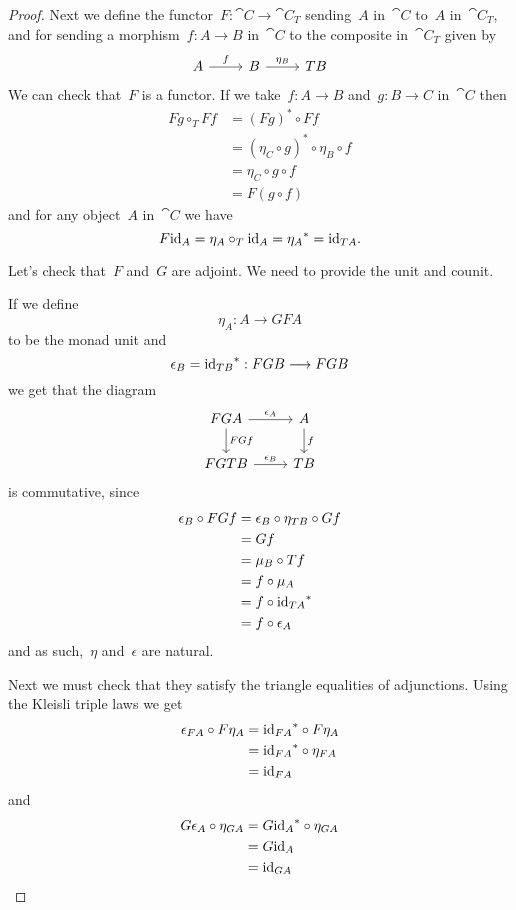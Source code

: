 \documentclass[../TFG.tex]{subfiles}
\begin{document}
\begin{proof}
    Next we define the functor~\(F:\cat{C}\longrightarrow\cat{C}_{T}\)
    sending~\(A\) in~\(\cat{C}\) to~\(A\) in~\(\cat{C}_{T}\), and for sending a
    morphism~\(f:A\longrightarrow B\) in~\(\cat{C}\) to the composite
    in~\(\cat{C}_{T}\) given by
    \[\begin{tikzcd}
        A \ar[r, "f"] & B \ar[r, "\eta_{B}"] & TB
    \end{tikzcd}\]
    We can check that~\(F\) is a functor. If we take~\(f:A\longrightarrow B\)
    and~\(g:B\longrightarrow C\) in~\(\cat{C}\) then
    \begin{align*}
        Fg \circ_{T} Ff
            &= (Fg)^{\ast} \circ Ff \\
            &= (\eta_{C} \circ g)^{\ast} \circ \eta_{B} \circ f \\
            &= \eta_{C} \circ g \circ f \\
            &= F(g \circ f)
    \end{align*}
    and for any object~\(A\) in~\(\cat{C}\) we have
    \[
        F\mathrm{id}_{A} = \eta_{A} \circ_{T} \mathrm{id}_{A} = {\eta_{A}}^{\ast} = \mathrm{id}_{TA}.
    \]

    Let's check that~\(F\) and~\(G\) are adjoint. We need to provide the unit
    and counit.

    If we define
    \[
        \eta_{A} : A \longrightarrow GF A
    \]
    to be the monad unit and
    \[
        \epsilon_{B} = {\mathrm{id}_{TB}}^{\ast} : FG B \longrightarrow FG B
    \]
    we get that the diagram
    \[\begin{tikzcd}
        FGA \ar[r, "\epsilon_{A}"] \ar[d, "FG f"] & A \ar[d, "f"] \\
        FGTB \ar[r, "\epsilon_{B}"] & TB
    \end{tikzcd}\]
    is commutative, since
    \begin{align*}
        \epsilon_{B} \circ FGf
            &= \epsilon_{B} \circ \eta_{TB} \circ Gf \\
            &= Gf \\
            &= \mu_{B} \circ Tf \\
            &= f \circ \mu_{A} \\
            &= f \circ {\mathrm{id}_{TA}}^{\ast} \\
            &= f \circ \epsilon_{A}
    \end{align*}
    and as such,~\(\eta\) and~\(\epsilon\) are natural.

    Next we must check that they satisfy the triangle equalities of adjunctions.
    Using the Kleisli triple laws we get
    \begin{align*}
        \epsilon_{FA} \circ F\eta_{A}
            &= {\mathrm{id}_{FA}}^{\ast} \circ F\eta_{A} \\
            &= {\mathrm{id}_{FA}}^{\ast} \circ \eta_{FA} \\
            &= \mathrm{id}_{FA}
    \end{align*}
    and
    \begin{align*}
        G\epsilon_{A} \circ \eta_{GA}
            &= G{\mathrm{id}_{A}}^{\ast} \circ \eta_{GA} \\
            &= G\mathrm{id}_{A} \\
            &= \mathrm{id}_{GA}
    \end{align*}


\end{proof}
\end{document}
